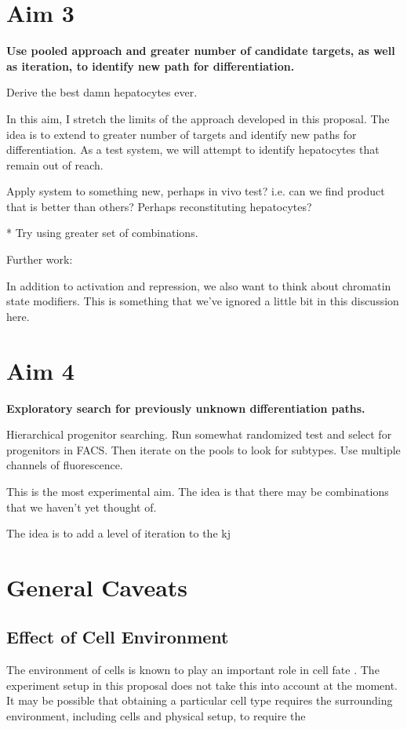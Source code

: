 \documentclass[10pt]{article}
\begin{document}
\section*{Aim 3}

\textbf{Use pooled approach and greater number of candidate targets, as well as iteration, to identify new path for differentiation.}

Derive the best damn hepatocytes ever.

In this aim, I stretch the limits of the approach developed in this proposal. The idea is to extend to greater number of targets and identify new paths for differentiation. As a test system, we will attempt to identify hepatocytes that remain out of reach.

Apply system to something new, perhaps in vivo test? i.e. can we find product that is better than others? Perhaps reconstituting hepatocytes?

* Try using greater set of combinations.

Further work:

In addition to activation and repression, we also want to think about chromatin state modifiers. This is something that we've ignored a little bit in this discussion here.

\section*{Aim 4}

\textbf{Exploratory search for previously unknown differentiation paths.}

Hierarchical progenitor searching. Run somewhat randomized test and select for progenitors in FACS. Then iterate on the pools to look for subtypes. Use multiple channels of fluorescence.

This is the most experimental aim. The idea is that there may be combinations that we haven't yet thought of.

The idea is to add a level of iteration to the kj

\section*{General Caveats}

\subsection*{Effect of Cell Environment}

The environment of cells is known to play an important role in cell fate \cite{drummond2008stem}. The experiment setup in this proposal does not take this into account at the moment. It may be possible that obtaining a particular cell type requires the surrounding environment, including cells and physical setup, to require the
\end{document}
